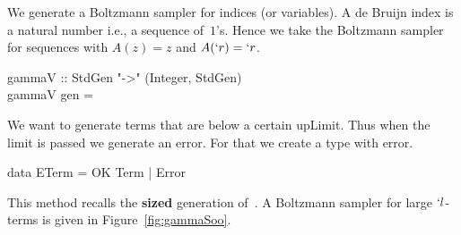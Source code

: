 \documentclass{sig-alternate}
\begin{document}
We generate a Boltzmann sampler for indices (or variables).  A de Bruijn index is a
natural number i.e.,  a sequence of~$1$'s.  Hence we take the Boltzmann sampler for
sequences with $A(z)=z$ and $A(`r) = `r$.
\begin{haskell}
  gammaV :: StdGen "->" (Integer, StdGen)\\
  gammaV gen = 
\end{haskell}
We want to generate terms that are below a certain \<upLimit\>.  Thus when the limit
is passed we generate an error.
For that we create a
type with error.
\begin{haskell}
  data ETerm = OK Term | Error
\end{haskell}
This method recalls the \textbf{sized} generation
of~\cite{DBLP:conf/icfp/ClaessenH00}. \ifICFP A Boltzmann sampler for large $`l$-terms
is given in Figure~\ref{fig:gammaSoo}.
\end{document}
